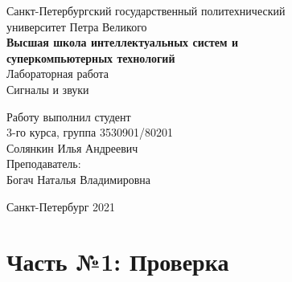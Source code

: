\documentclass[a4paper]{article}
\begin{document}
    \begin{center}
        \begin{center}
        \hfill \break
        \normalsize{Санкт-Петербургский государственный политехнический}\\
        \normalsize{университет Петра Великого}\\
        \hfill \break
        \normalsize{\textbf{Высшая школа интеллектуальных систем и}}\\ 
        \normalsize{\textbf{суперкомпьютерных технологий}}\\ 
        \hfill \break
        \hfill \break
        \hfill \break
        \normalsize{Лабораторная работа}\\
        \hfill \break
        \hfill \break
        \normalsize{\LARGE Сигналы и звуки}\\
        \end{center}
        \hfill \break
        \hfill \break
        \hfill \break
        \hfill \break
        \hfill \break
        \hfill \break
        \hfill \break
        \hfill \break
        \hfill \break
        \hfill \break
        \begin{flushright}
            \normalsize{Работу выполнил студент}\\
            \normalsize{3-го курса, группа 3530901/80201}\\
            \normalsize{Солянкин Илья Андреевич}\\
            \hfill \break
            \normalsize{Преподаватель:}\\
            \normalsize{Богач Наталья Владимировна}\\
        \end{flushright}
        \hfill \break
        \hfill \break
        \hfill \break
        \hfill \break
        \begin{center} Санкт-Петербург 2021 \end{center}
        \thispagestyle{empty}
    \end{center}
    
    \newpage
        \tableofcontents
    
    \newpage
         \listoffigures
    
    \newpage
         \lstlistoflistings   
     
    \newpage
        \section{Часть №1: Проверка}
        
\end{document}

